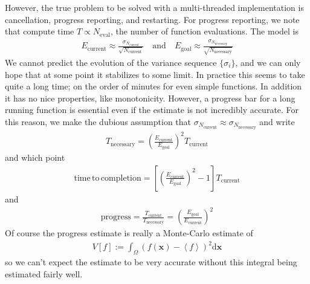 \documentclass[landscape]{article}
\numberwithin{equation}{section}
\begin{document}
However, the true problem to be solved with a multi-threaded implementation is cancellation, progress reporting, and restarting.
For progress reporting, we note that compute time $T \propto N_{\mathrm{eval}}$, the number of function evaluations.
The model is
\begin{align*}
E_{\mathrm{current}} \approx \frac{\sigma_{N_{\mathrm{current}}}}{\sqrt{N_{\mathrm{current}}}}
\quad \mathrm{and} \quad
E_{\mathrm{goal}} \approx \frac{\sigma_{N_{\mathrm{necessary}}}}{\sqrt{N_{\mathrm{necessary}}}}
\end{align*}
We cannot predict the evolution of the variance sequence $\{\sigma_{i}\}$, and we can only hope that at some point it stabilizes to some limit.
In practice this seems to take quite a long time; on the order of minutes for even simple functions.
In addition it has no nice properties, like monotonicity.
However, a progress bar for a long running function is essential even if the estimate is not incredibly accurate.
For this reason, we make the dubious assumption that $\sigma_{N_{\mathrm{current}}} \approx \sigma_{N_{\mathrm{necessary}}}$ and write
\begin{align*}
T_{\mathrm{necessary}} = \left( \frac{E_{\mathrm{current}}}{E_{\mathrm{goal}}} \right)^{2}T_{\mathrm{current}}
\end{align*}
and which point
\begin{align*}
\mathrm{time\, to\, completion } = \left[\left( \frac{E_{\mathrm{current}}}{E_{\mathrm{goal}}} \right)^{2} -1 \right]T_{\mathrm{current}}
\end{align*}
and
\begin{align*}
\mathrm{progress} = \frac{T_{\mathrm{current}}}{T_{\mathrm{necessary}}} = \left( \frac{E_{\mathrm{goal}}}{E_{\mathrm{current}}} \right)^{2}
\end{align*}
Of course the progress estimate is really a Monte-Carlo estimate of
\begin{align*}
V[f] := \int_{\Omega} (f(\mathbf{x}) - \left<f\right>)^{2} \mathrm{d}\mathbf{x}
\end{align*}
so we can't expect the estimate to be very accurate without this integral being estimated fairly well.
\end{document}
